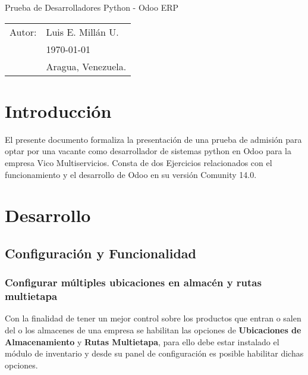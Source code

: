 \documentclass[11pt,letterpaper]{article}
\begin{document}
\newpage
\pagestyle{fancy}
\fancyhf{}
\vspace*{6cm}
\begin{center}
\Huge  {Prueba de Desarrolladores Python - Odoo ERP}\\
\vspace{1cm}
\end{center}
\vfill
\begin{flushright}
\begin{tabular}{ll}
Autor: & Luis E. Millán U.\\
& \today\\
& Aragua, Venezuela.
\end{tabular}
\end{flushright}

\newpage
\pagestyle{fancy}
\fancyhf{}
\fancyhead[L]{\rightmark}
\fancyhead[R]{\small \rm \textbf{\thepage}}
\renewcommand{\sectionmark}[1]{\markright{\thesection.\ #1}}
\renewcommand{\headrulewidth}{0.5pt}
\renewcommand{\footrulewidth}{0.5pt}
\tableofcontents
\newpage	
\section{Introducción}
	El presente documento formaliza la presentación de una prueba de admisión para optar por una vacante como desarrollador de sistemas python en Odoo para la empresa Vico Multiservicios. Consta de dos Ejercicios relacionados con el funcionamiento y el desarrollo de Odoo en su versión Comunity 14.0.
\section{Desarrollo}
\subsection{Configuración y Funcionalidad}
\subsubsection{Configurar múltiples ubicaciones en almacén y rutas multietapa}
Con la finalidad de tener un mejor control sobre los productos que entran o salen del o los almacenes de una empresa se habilitan las opciones de \textbf{Ubicaciones de Almacenamiento} y \textbf{Rutas Multietapa}, para ello debe estar instalado el módulo de inventario y desde su panel de configuración es posible habilitar dichas opciones.
\end{document}
